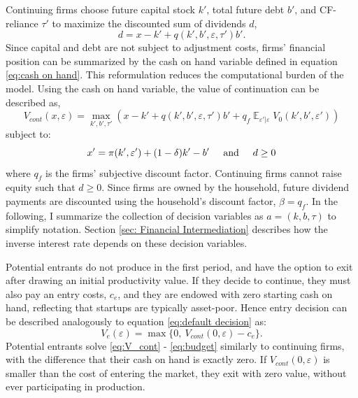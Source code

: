 \documentclass[12pt]{article}
\DeclareMathOperator{\E}{\mathbb{E}}
\begin{document}
Continuing firms choose future capital stock $k'$, total future debt $b'$, and CF-reliance $\tau'$ to maximize the discounted sum of dividends $d$, 
\begin{equation} \label{eq:dividends}
d = x - k' + q(k',b',\varepsilon, \tau')b'.
\end{equation} 
Since capital and debt are not subject to adjustment costs, firms' financial position can be summarized by the cash on hand variable defined in equation \ref{eq:cash on hand}. This reformulation reduces the computational burden of the model. Using the cash on hand variable, the value of continuation can be described as,
\begin{equation} \label{eq:V_cont}
 V_{cont}(x,\varepsilon) = \max_{k',b', \tau'} \left(x - k' +  q(k',b',\varepsilon, \tau')b' + q_f \E_{\varepsilon'|\varepsilon} V_0(k',b', \varepsilon') \right)
\end{equation}
subject to: 
\begin{equation} \label{eq:budget}
x' = \pi(k',\varepsilon')+(1-\delta)k'-b' \hspace{5mm} \text{and} \hspace{5mm} d \geq 0
\end{equation} 
where $q_f$ is the firms' subjective discount factor. Continuing firms cannot raise equity such that $d \geq 0$. Since firms are owned by the household, future dividend payments are discounted using the household's discount factor, $\beta = q_f$. In the following, I summarize the collection of decision variables as $a = (k, b, \tau) $ to simplify notation. Section \ref{sec: Financial Intermediation} describes how the inverse interest rate depends on these decision variables.  

Potential entrants do not produce in the first period, and have the option to exit after drawing an initial productivity value. If they decide to continue, they must also pay an entry costs, $c_e$, and they are endowed with zero starting cash on hand, reflecting that startups are typically asset-poor. Hence entry decision can be described analogously to equation \ref{eq:default decision} as: 
\begin{equation} \label{eq:entrant decision}
 V_e(\varepsilon) = \max \{0, \ V_{cont}(0,\varepsilon) - c_e \}.
\end{equation}
Potential entrants solve \ref{eq:V_cont} - \ref{eq:budget} similarly to continuing firms, with the difference that their cash on hand is exactly zero. If $V_{cont}(0,\varepsilon)$ is smaller than the cost of entering the market, they exit with zero value, without ever participating in production.
\end{document}
